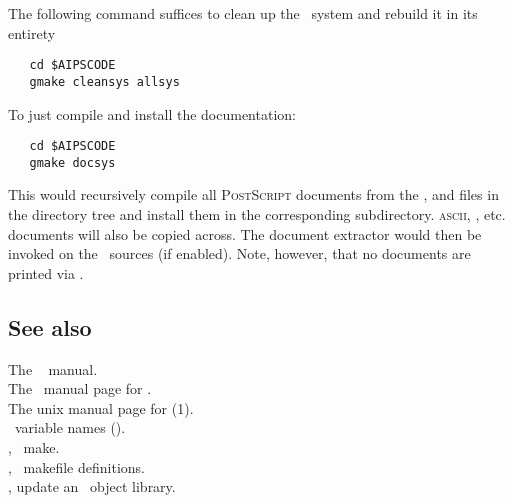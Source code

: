 The following command suffices to clean up the \aipspp\ system and rebuild it
in its entirety

\begin{verbatim}
   cd $AIPSCODE
   gmake cleansys allsys
\end{verbatim}

\noindent
To just compile and install the documentation:

\begin{verbatim}
   cd $AIPSCODE
   gmake docsys
\end{verbatim}

\noindent
This would recursively compile all \textsc{PostScript} documents from the
,  and  files in the
 directory tree and install them in the corresponding
 subdirectory.  \textsc{ascii}, , 
etc.  documents will also be copied across.  The document extractor would then
be invoked on the \cplusplus\ sources (if enabled).  Note, however, that no
documents are printed via .

\subsection*{See also}

The \gnu\  manual.\\
The \gnu\ manual page for .\\
The unix manual page for (1).\\
\aipspp\ variable names ().\\
, \gnu\ make.\\
, \aipspp\ makefile definitions.\\
, update an \aipspp\ object library.

 
\newpage
\section{}
\label{mkinst}



